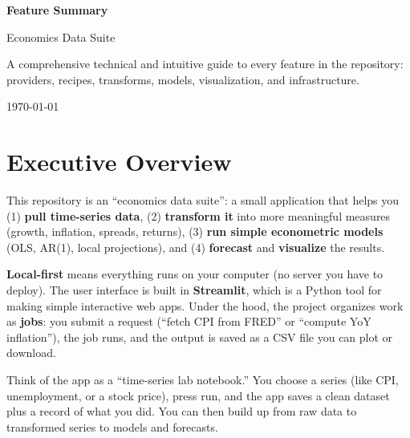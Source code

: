 \documentclass[11pt,a4paper]{article}
\begin{document}
\begin{titlepage}
  \centering
  \vspace*{2cm}
  {\sffamily\Huge\bfseries\color{accent} Feature Summary\par}
  \vspace{0.5cm}
  {\LARGE Economics Data Suite\par}
  \vspace{2cm}
  \begin{tcolorbox}[colback=accentlight,colframe=accent,width=0.9\textwidth,arc=4pt]
    \centering
    \small
    A comprehensive technical and intuitive guide to every feature in the repository:\\
    providers, recipes, transforms, models, visualization, and infrastructure.
  \end{tcolorbox}
  \vfill
  {\large \today\par}
\end{titlepage}

\tableofcontents
\newpage

\section{Executive Overview}

This repository is an ``economics data suite'': a small application that helps you (1) \textbf{pull time-series data}, (2) \textbf{transform it} into more meaningful measures (growth, inflation, spreads, returns), (3) \textbf{run simple econometric models} (OLS, AR(1), local projections), and (4) \textbf{forecast} and \textbf{visualize} the results.

\vspace{0.5em}
\noindent\textbf{Local-first} means everything runs on your computer (no server you have to deploy). The user interface is built in \textbf{Streamlit}, which is a Python tool for making simple interactive web apps. Under the hood, the project organizes work as \textbf{jobs}: you submit a request (``fetch CPI from FRED'' or ``compute YoY inflation''), the job runs, and the output is saved as a CSV file you can plot or download.

\begin{intuitionbox}
Think of the app as a ``time-series lab notebook.'' You choose a series (like CPI, unemployment, or a stock price), press run, and the app saves a clean dataset plus a record of what you did. You can then build up from raw data to transformed series to models and forecasts.
\end{intuitionbox}
\end{document}
